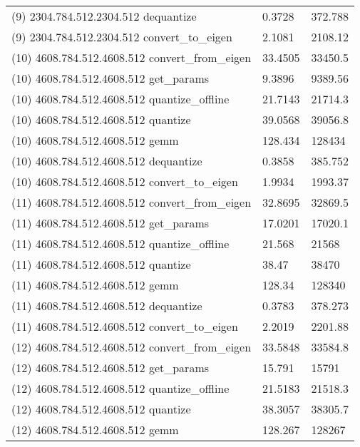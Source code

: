 \begin{longtable}{lll}
(9) 2304.784.512.2304.512 dequantize             & 0.3728         & 372.788          \\
(9) 2304.784.512.2304.512 convert\_to\_eigen     & 2.1081         & 2108.12          \\
(10) 4608.784.512.4608.512 convert\_from\_eigen  & 33.4505        & 33450.5          \\
(10) 4608.784.512.4608.512 get\_params           & 9.3896         & 9389.56          \\
(10) 4608.784.512.4608.512 quantize\_offline     & 21.7143        & 21714.3          \\
(10) 4608.784.512.4608.512 quantize              & 39.0568        & 39056.8          \\
(10) 4608.784.512.4608.512 gemm                  & 128.434        & 128434           \\
(10) 4608.784.512.4608.512 dequantize            & 0.3858         & 385.752          \\
(10) 4608.784.512.4608.512 convert\_to\_eigen    & 1.9934         & 1993.37          \\
(11) 4608.784.512.4608.512 convert\_from\_eigen  & 32.8695        & 32869.5          \\
(11) 4608.784.512.4608.512 get\_params           & 17.0201        & 17020.1          \\
(11) 4608.784.512.4608.512 quantize\_offline     & 21.568         & 21568            \\
(11) 4608.784.512.4608.512 quantize              & 38.47          & 38470            \\
(11) 4608.784.512.4608.512 gemm                  & 128.34         & 128340           \\
(11) 4608.784.512.4608.512 dequantize            & 0.3783         & 378.273          \\
(11) 4608.784.512.4608.512 convert\_to\_eigen    & 2.2019         & 2201.88          \\
(12) 4608.784.512.4608.512 convert\_from\_eigen  & 33.5848        & 33584.8          \\
(12) 4608.784.512.4608.512 get\_params           & 15.791         & 15791            \\
(12) 4608.784.512.4608.512 quantize\_offline     & 21.5183        & 21518.3          \\
(12) 4608.784.512.4608.512 quantize              & 38.3057        & 38305.7          \\
(12) 4608.784.512.4608.512 gemm                  & 128.267        & 128267           \\

\end{longtable}
